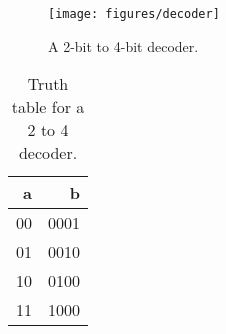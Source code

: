 \documentclass[%
    10pt,
    headinclude, footexclude,
    openright, %
    notitlepage,
    cleardoubleempty,
    headsepline,
    pointlessnumbers,
    bibtotoc, idxtotoc,
    ]{scrbook}
\newcommand{\code}[1]{{\small{\texttt{#1}}}}
\newcommand{\scale}{0.7}
\newif\ifshoworiginal
\newif\ifshowtransfirst
\newif\ifshowtranssecond
\begin{document}
\begin{figure}
  \centering
  \texttt{[image: figures/decoder]}
  \caption{A 2-bit to 4-bit decoder.}
  \label{fig:decoder}
\end{figure}

\ifshoworiginal
Figure~\ref{fig:decoder} shows a 2-bit to 4-bit decoder. We can describe the function
of the decoder with a truth table, such as Table~\ref{tab:decoder}.
\fi

\ifshowtransfirst %
図〜\ref{fig:decoder}は、2ビットから4ビットのデコーダを示しています。
私たちは、このような表〜\ref{tab:decoder}として、真理値表とデコーダの機能を記述することができます。
\fi
\ifshowtranssecond %
図〜\ref{fig:decoder}は、2ビットから4ビットのデコーダを示しています。このデコーダの機能は、表〜\ref{tab:decoder}のような真理値表として表現できます。
\fi

\begin{table}
 \centering
 \label{tab:decoder}
  \begin{tabular}{rr}
    \toprule
    a & b \\
    \midrule
    00 & 0001 \\
    01 & 0010 \\
    10 & 0100 \\
    11 & 1000 \\
    \bottomrule
  \end{tabular}
  \caption{Truth table for a 2 to 4 decoder.}
\end{table}

\ifshoworiginal
A Chisel \code{switch} statement describes the logic as a truth table.
The \code{switch} statement is not part of the core Chisel language.
Therefore, we need to include the elements of the package \code{chisel.util}.
\fi

\ifshowtransfirst %
Chisel\code{switch}文は、真理値表などのロジックを記述します。
\code{switch}文は、コアChisel言語の一部ではありません。
したがって、我々はパッケージ\code{chisel.util}の要素を含める必要があります。
\fi
\ifshowtranssecond %
Chiselの\code{switch}文は、真理値表のような論理を記述します。\code{switch}文は、Chiselの言語機能の一部ではありません。そのため使用する際には、パッケージ\code{chisel3.util}をインポートする必要があります。
\fi


\ifshoworiginal
\noindent The following code introduces the \code{switch} statement of Chisel to describe a decoder:
\fi
\end{document}

